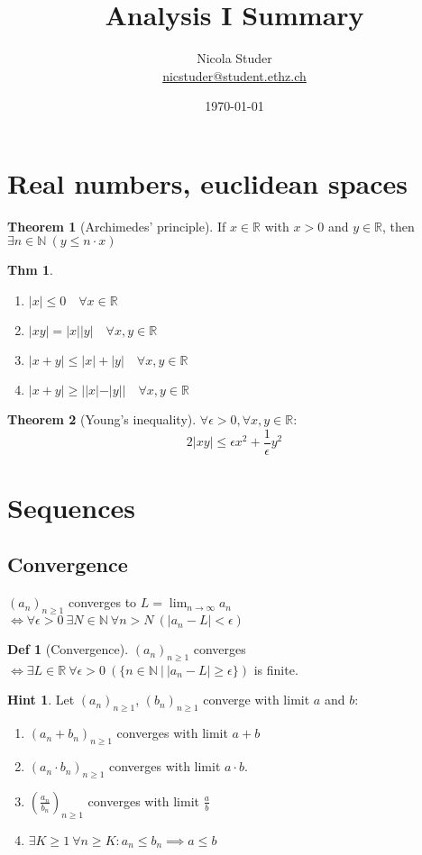 \documentclass[a4paper, 10pt]{article}
\title{Analysis I Summary}
\author{Nicola Studer \\ \href{mailto:nicstuder@student.ethz.ch}{nicstuder@student.ethz.ch}}
\date{\today}
\theoremstyle{definition}
\newtheorem*{theorem}{Thm}
\newtheorem*{definition}{Def}
\newtheorem*{note_wrapper}{Hint}
\theoremstyle{named}
\newtheorem*{ntheorem_wrapper}{Theorem}
\newenvironment{ntheorem}%
    {\begin{mdframed}[style=important]\begin{ntheorem_wrapper}}%
    {\end{ntheorem_wrapper}\end{mdframed}}
\newenvironment{note}%
    {\begin{mdframed}[style=trick]\begin{note_wrapper}}%
    {\end{note_wrapper}\end{mdframed}}
\newcommand{\R}{\mathbb{R}}
\newcommand{\N}{\mathbb{N}}
\begin{document}
\maketitle

\section{Real numbers, euclidean spaces}
\begin{ntheorem}[Archimedes' principle]
    If $x \in \R$ with $x > 0$ and $y \in \R$, then $\exists n \in \N \ (y \leq n \cdot x)$
\end{ntheorem}

\begin{theorem}
    \begin{enumerate}[label=(\roman*)]
        \item $|x| \leq 0 \quad \forall x \in \R$
        \item $|xy| = |x||y| \quad \forall x, y \in \R$
        \item $|x + y| \leq |x| + |y| \quad \forall x, y \in \R$
        \item $|x + y| \geq ||x| - |y|| \quad \forall x, y \in \R$
    \end{enumerate}
\end{theorem}

\begin{ntheorem}[Young's inequality]
    $\forall \epsilon > 0, \forall x, y \in \R$:
    $$2 |xy| \leq \epsilon x^2 + \frac{1}{\epsilon} y^2$$
\end{ntheorem}

\section{Sequences}
\subsection{Convergence}
$(a_n)_{n \geq 1}$ converges to $L = \lim_{n \to \infty} a_n$ $\iff \forall \epsilon > 0 \ \exists N \in \N \ \forall n > N \ (|a_n - L | < \epsilon)$

\begin{definition}[Convergence]
    $(a_n)_{n \geq 1}$ converges $\iff \exists L \in \R  \ \forall \epsilon > 0 \ (\{n \in \N \ | \ |a_n - L| \geq \epsilon \})$ is finite.
\end{definition}

\begin{note}
    Let $(a_n)_{n\geq1}$, $(b_n)_{n\geq1}$ converge with limit $a$ and $b$:
    \begin{enumerate}
        \item $(a_n + b_n)_{n\geq1}$ converges with limit $a + b$
        \item $(a_n \cdot b_n)_{n\geq1}$ converges with limit $a \cdot b$.
        \item $(\frac{a_n}{b_n})_{n\geq1}$ converges with limit $\frac{a}{b}$
        \item $\exists K \geq 1 \ \forall n \geq K: a_n \leq b_n \implies a \leq b$
    \end{enumerate}
\end{note}
\end{document}
